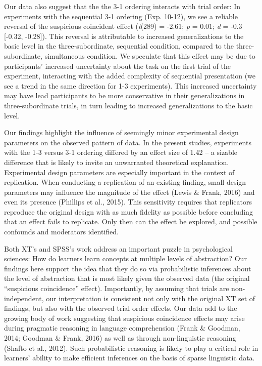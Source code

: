 \documentclass[english,floatsintext,man]{apa6}
\theoremstyle{definition}
\theoremstyle{definition}
\theoremstyle{remark}
\begin{document}
Our data also suggest that the the 3-1 ordering interacts with trial
order: In experiments with the sequential 3-1 ordering (Exp. 10-12), we
see a reliable reversal of the suspicious coincident effect
(\emph{t}(289) = -2.61; \emph{p} = 0.01; \emph{d} = -0.3 {[}-0.32,
-0.28{]}). This reversal is attributable to increased generalizations to
the basic level in the three-subordinate, sequential condition, compared
to the three-subordinate, simultaneous condition. We speculate that this
effect may be due to participants' increased uncertainty about the task
on the first trial of the experiment, interacting with the added
complexity of sequential presentation (we see a trend in the same
direction for 1-3 experiments). This increased uncertainty may have lead
participants to be more conservative in their generalizations in
three-subordinate trials, in turn leading to increased generalizations
to the basic level.

Our findings highlight the influence of seemingly minor experimental
design parameters on the observed pattern of data. In the present
studies, experiments with the 1-3 versus 3-1 ordering differed by an
effect size of 1.42 -- a sizable difference that is likely to invite an
unwarranted theoretical explanation. Experimental design parameters are
especially important in the context of replication. When conducting a
replication of an existing finding, small design parameters may
influence the magnitude of the effect (Lewis \& Frank, 2016) and even
its presence (Phillips et al., 2015). This sensitivity requires that
replicators reproduce the original design with as much fidelity as
possible before concluding that an effect fails to replicate. Only then
can the effect be explored, and possible confounds and moderators
identified.

Both XT's and SPSS's work address an important puzzle in psychological
sciences: How do learners learn concepts at multiple levels of
abstraction? Our findings here support the idea that they do so via
probabilistic inferences about the level of abstraction that is most
likely given the observed data (the original \enquote{suspicious
coincidence} effect). Importantly, by assuming that trials are
non-independent, our interpretation is consistent not only with the
original XT set of findings, but also with the observed trial order
effects. Our data add to the growing body of work suggesting that
suspicious coincidence effects may arise during pragmatic reasoning in
language comprehension (Frank \& Goodman, 2014; Goodman \& Frank, 2016)
as well as through non-linguistic reasoning (Shafto et al., 2012). Such
probabilistic reasoning is likely to play a critical role in learners'
ability to make efficient inferences on the basis of sparse linguistic
data.
\end{document}
